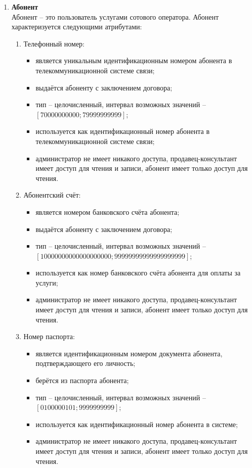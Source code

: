 \begin{enumerate}
    \item \textbf{Абонент} \\
    Абонент -- это пользователь услугами сотового оператора. Абонент характеризуется следующими атрибутами:
    \begin{enumerate}
        \item Телефонный номер:
        \begin{itemize}
            \item является уникальным идентификационным номером абонента в телекоммуникационной системе связи;
            \item выдаётся абоненту с заключением договора;
            \item тип -- целочисленный, интервал возможных значений -- $[70000000000; 79999999999]$;
            \item используется как идентификационный номер абонента в телекоммуникационной системе связи;
            \item администратор не имеет никакого доступа, продавец-консультант имеет доступ для чтения и записи, абонент имеет только доступ для чтения.
        \end{itemize}

        \item Абонентский счёт:
        \begin{itemize}
            \item является номером банковского счёта абонента;
            \item выдаётся абоненту с заключением договора;
            \item тип -- целочисленный, интервал возможных значений -- $[10000000000000000000; 99999999999999999999]$;
            \item используется как номер банковского счёта абонента для оплаты за услуги;
            \item администратор не имеет никакого доступа, продавец-консультант имеет доступ для чтения и записи, абонент имеет только доступ для чтения.
        \end{itemize}

        \item Номер паспорта:
        \begin{itemize}
            \item является идентификационным номером документа абонента, подтверждающего его личность;
            \item берётся из паспорта абонента;
            \item тип -- целочисленный, интервал возможных значений -- $[0100000101; 9999999999]$;
            \item используется как идентификационный номер абонента в системе;
            \item администратор не имеет никакого доступа, продавец-консультант имеет доступ для чтения и записи, абонент имеет только доступ для чтения.
        \end{itemize}


\end{enumerate}
\end{enumerate}
